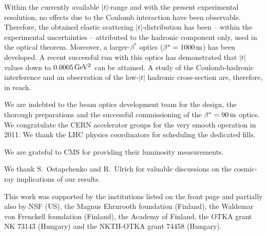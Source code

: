 \documentclass[doublecol]{epl/epl2}
\def\un#1{\,{\rm #1}}
\begin{document}
Within the currently available $|t|$-range and with the present experimental resolution, no effects due to the Coulomb interaction have been observable. Therefore, the obtained elastic scattering $|t|$-distribution has been -- within the experimental uncertainties -- attributed to the hadronic component only, used in the optical theorem. Moreover, a larger-$\beta^*$ optics ($\beta^* = 1000\un{m}$) has been developed. A recent successful run with this optics has demonstrated that $|t|$ values down to $0.0005\un{GeV^2}$ can be attained. A study of the Coulomb-hadronic interference and an observation of the low-$|t|$ hadronic cross-section are, therefore, in reach.

\acknowledgments

We are indebted to the beam optics development team
for the design, the thorough preparations and the successful commissioning of the $\beta^* = 90\un{m}$ optics. We congratulate the CERN accelerator groups for the very smooth operation in 2011. We thank
the LHC physics coordinators for scheduling the dedicated fills.

We are grateful to CMS for providing their luminosity measurements.

We thank S.~Ostapchenko and R.~Ulrich for valuable discussions on the cosmic-ray implications of our results.

This work was supported by the institutions listed on the front page and partially also by NSF (US), the Magnus
Ehrnrooth foundation (Finland), the Waldemar von Frenckell foundation (Finland), the Academy of
Finland, the OTKA grant NK 73143 (Hungary) and the NKTH-OTKA grant 74458 (Hungary).
\end{document}
